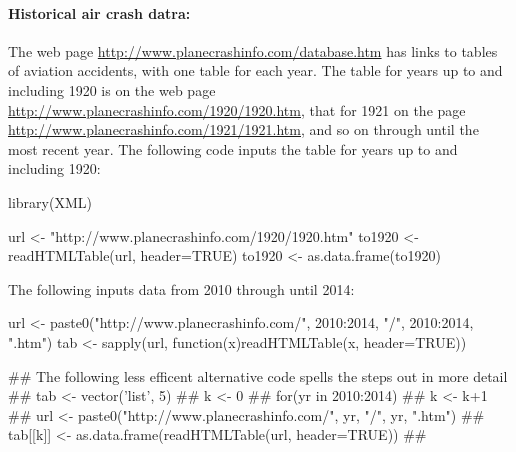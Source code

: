 \paragraph{Historical air crash datra:}
The web page \url{http://www.planecrashinfo.com/database.htm}
has links to tables of aviation accidents, with one table for
each year. The table for years up to and including 1920 is on
the web page \url{http://www.planecrashinfo.com/1920/1920.htm},
that for 1921 on the page \url{http://www.planecrashinfo.com/1921/1921.htm},
and so on through until the most recent year.  The following code
inputs the table for years up to and including 1920:

\begin{Schunk}
\begin{Sinput}
library(XML)
\end{Sinput}
\end{Schunk}

\begin{Schunk}
\begin{Sinput}
url <- "http://www.planecrashinfo.com/1920/1920.htm"
to1920 <- readHTMLTable(url, header=TRUE)
to1920 <- as.data.frame(to1920)
\end{Sinput}
\end{Schunk}

The following inputs data from 2010 through until 2014:
\begin{fullwidth}

\begin{Schunk}
\begin{Sinput}
url <- paste0("http://www.planecrashinfo.com/",
              2010:2014, "/", 2010:2014, ".htm")
tab <- sapply(url, function(x)readHTMLTable(x, header=TRUE))
\end{Sinput}
\end{Schunk}

\end{fullwidth}

{\small
\begin{fullwidth}

\begin{Schunk}
\begin{Sinput}
## The following less efficent alternative code spells the steps out in more detail
## tab <- vector('list', 5)
## k <- 0
## for(yr in 2010:2014){
##  k <- k+1
##  url <- paste0("http://www.planecrashinfo.com/", yr, "/", yr, ".htm")
##  tab[[k]] <- as.data.frame(readHTMLTable(url, header=TRUE))
## }
\end{Sinput}
\end{Schunk}

\end{fullwidth}
}

